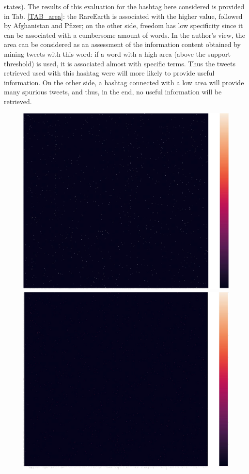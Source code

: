 \documentclass[12pt,%
               a4paper,%
               oneside,openany,%
               titlepage,%
               headinclude,footinclude,%
               BCOR5mm,%
               cleardoublepage=empty,%
               tablecaptionabove,%
               floatperchapter,
               ]{scrreprt}                 %
\begin{document}
states). The results of this evaluation for the hashtag here considered is provided in Tab. \ref{TAB_area}: the RareEarth is associated with the higher value, followed by Afghanistan and Pfizer; on the other side, freedom has low specificity since it can be associated with a cumbersome amount of words. In the author's view, the area can be considered as an assessment of the information content obtained by mining tweets with this word: if a word with a high area (above the support threshold) is used, it is associated almost with specific terms. Thus the tweets retrieved used with this hashtag were will more likely to provide useful information. On the other side, a hashtag connected with a low area will provide many spurious tweets, and thus, in the end, no useful information will be retrieved.

\begin{figure}[ht]
  \begin{minipage}[b]{0.5\linewidth}
    \centering
    \includegraphics[width=.9\linewidth]{Figures/Matrix_rareearth.jpg}
    \vspace{4ex}
  \end{minipage}
  \begin{minipage}[b]{0.5\linewidth}
    \centering
    \includegraphics[width=.9\linewidth]{Figures/Matrix_afghanistan.jpg}

\end{minipage}
\end{figure}
\end{document}
